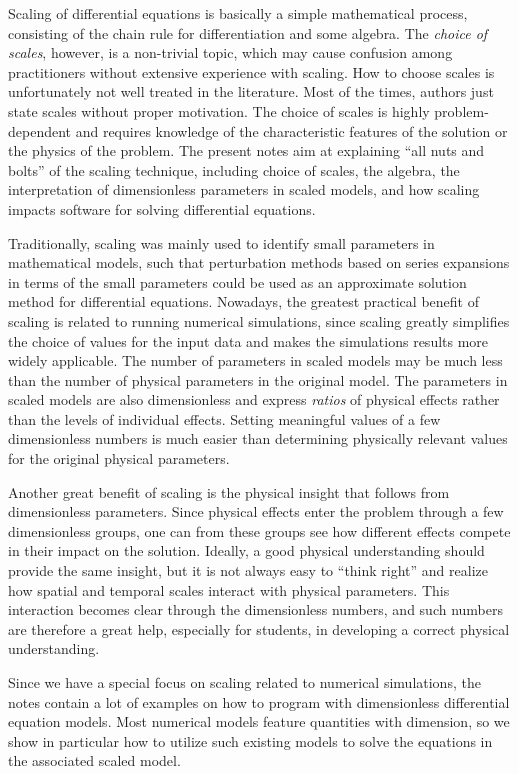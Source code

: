 \documentclass[graybox,envcountchap,sectrefs,final]{svmonodo}
\begin{document}
Scaling of differential equations is basically a simple mathematical
process, consisting of the chain rule for differentiation and some
algebra.  The \emph{choice of scales}, however, is a non-trivial topic,
which may cause confusion among practitioners without extensive
experience with scaling.  How to choose scales is unfortunately not
well treated in the literature. Most of the times, authors just state
scales without proper motivation. The choice of scales is highly
problem-dependent and requires knowledge of the characteristic
features of the solution or the physics of the problem.  The present
notes aim at explaining ``all nuts and bolts'' of the scaling
technique, including choice of scales, the algebra, the interpretation
of dimensionless parameters in scaled models, and how scaling impacts
software for solving differential equations.

Traditionally, scaling was mainly used to identify small parameters in
mathematical models, such that perturbation methods based on series
expansions in terms of the small parameters could be used as an
approximate solution method for differential equations.  Nowadays, the
greatest practical benefit of scaling is related to running numerical
simulations, since scaling greatly simplifies the choice of values for
the input data and makes the simulations results more widely
applicable.  The number of parameters in scaled models may be much
less than the number of physical parameters in the original model. The
parameters in scaled models are also dimensionless and express
\emph{ratios} of physical effects rather than the levels of individual
effects.  Setting meaningful values of a few dimensionless numbers is
much easier than determining physically relevant values for the
original physical parameters.

Another great benefit of scaling is the physical insight that follows
from dimensionless parameters. Since physical effects enter the
problem through a few dimensionless groups, one can from these groups
see how different effects compete in their impact on the
solution. Ideally, a good physical understanding should provide the
same insight, but it is not always easy to ``think right'' and realize
how spatial and temporal scales interact with physical parameters.
This interaction becomes clear through the dimensionless numbers, and
such numbers are therefore a great help, especially for students, in
developing a correct physical understanding.

Since we have a special focus on scaling related to numerical
simulations, the notes contain a lot of examples on how to program
with dimensionless differential equation models. Most numerical models
feature quantities with dimension, so we show in particular how to
utilize such existing models to solve the equations in the associated
scaled model.
\end{document}
